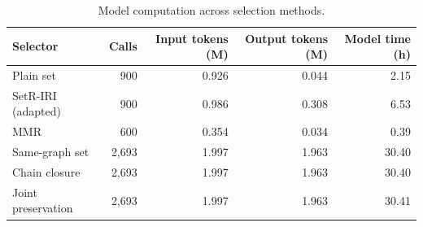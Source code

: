 \begin{table}[pos=H]
\caption{Model computation across selection methods.}\label{tab:cost}
\centering\small
\setlength{\tabcolsep}{6pt}
\begin{tabular}{lrrrr}
\toprule
Selector & Calls & Input tokens (M) & Output tokens (M) & Model time (h) \\
\midrule
Plain set & 900 & 0.926 & 0.044 & 2.15 \\
SetR-IRI (adapted) & 900 & 0.986 & 0.308 & 6.53 \\
MMR & 600 & 0.354 & 0.034 & 0.39 \\
Same-graph set & 2,693 & 1.997 & 1.963 & 30.40 \\
Chain closure & 2,693 & 1.997 & 1.963 & 30.40 \\
Joint preservation & 2,693 & 1.997 & 1.963 & 30.41 \\
\bottomrule
\end{tabular}
\end{table}
